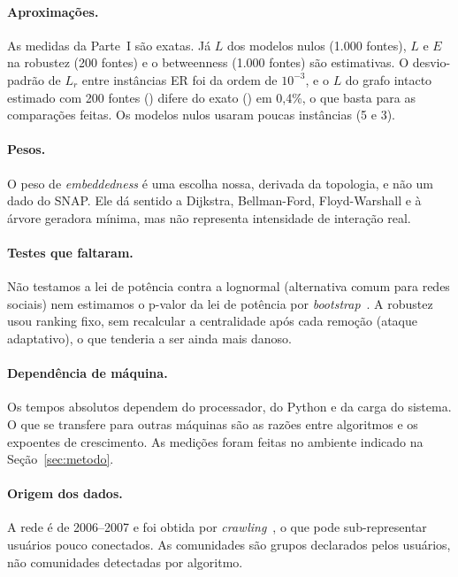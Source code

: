 \IfFileExists{webmedia.cls}{\documentclass[sigconf]{webmedia}}{\documentclass[sigconf]{acmart}}
\begin{document}
\paragraph{Aproximações.} As medidas da Parte~I são exatas. Já $L$ dos modelos nulos (1.000 fontes), $L$ e $E$ na robustez (200 fontes) e o betweenness (1.000 fontes) são estimativas. O desvio-padrão de $L_r$ entre instâncias ER foi da ordem de $10^{-3}$, e o $L$ do grafo intacto estimado com 200 fontes (\robLbase) difere do exato (\caminhoMedio) em 0,4\%, o que basta para as comparações feitas. Os modelos nulos usaram poucas instâncias (5 e 3).

\paragraph{Pesos.} O peso de \emph{embeddedness} é uma escolha nossa, derivada da topologia, e não um dado do SNAP. Ele dá sentido a Dijkstra, Bellman-Ford, Floyd-Warshall e à árvore geradora mínima, mas não representa intensidade de interação real.

\paragraph{Testes que faltaram.} Não testamos a lei de potência contra a lognormal (alternativa comum para redes sociais) nem estimamos o p-valor da lei de potência por \emph{bootstrap}~\cite{clauset2009}. A robustez usou ranking fixo, sem recalcular a centralidade após cada remoção (ataque adaptativo), o que tenderia a ser ainda mais danoso.

\paragraph{Dependência de máquina.} Os tempos absolutos dependem do processador, do Python e da carga do sistema. O que se transfere para outras máquinas são as razões entre algoritmos e os expoentes de crescimento. As medições foram feitas no ambiente indicado na Seção~\ref{sec:metodo}.

\paragraph{Origem dos dados.} A rede é de 2006--2007 e foi obtida por \emph{crawling}~\cite{mislove2007}, o que pode sub-representar usuários pouco conectados. As comunidades são grupos declarados pelos usuários, não comunidades detectadas por algoritmo.

\end{document}
